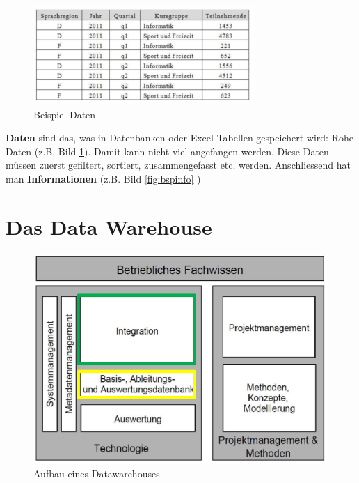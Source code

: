 \documentclass[a4paper, 11pt]{article}
\begin{document}
\begin{figure}
	\centering
	\includegraphics[keepaspectratio=true,height=10\baselineskip]{BspDaten.png}
	\caption{Beispiel Daten}
	\label{fig:bspdata}
\end{figure} 

\textbf{Daten} sind das, was in Datenbanken oder Excel-Tabellen gespeichert wird: Rohe Daten (z.B. Bild \ref{fig:bspdata}). Damit kann nicht viel angefangen werden. Diese Daten müssen zuerst gefiltert, sortiert, zusammengefasst etc. werden. Anschliessend hat man \textbf{Informationen} (z.B. Bild \ref{fig:bspinfo} )



\section{Das Data Warehouse}

\begin{figure}
	\centering
	\includegraphics[keepaspectratio=true,height=10\baselineskip]{datawarehouse.png}
	\caption{Aufbau eines Datawarehouses}
	\label{fig:datawarehouse}
\end{figure}
\end{document}
